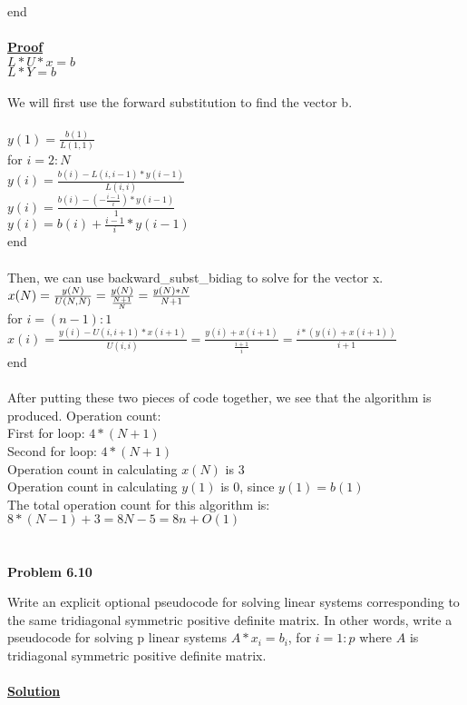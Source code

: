 \documentclass{article}
\begin{document}
			\indent \hspace{5 cm} end \\\\
\underline{\textbf {Proof}} \\
	\indent \(L*U*x=b\)\\
	\indent \(L*Y=b\)\\\\
We will first use the forward substitution to find the vector b. \\\\
\(y(1) = \frac{b(1)}{L(1,1)}\)\\
for \(i=2:N\)\\
	\indent \(y(i) = \frac{b(i)-L(i,i-1)*y(i-1)}{L(i,i)}\)\\
	\indent \(y(i) = \frac{b(i)-(-\frac{i-1}{i})*y(i-1)}{1}\)\\
	\indent \(y(i) = b(i)+\frac{i-1}{i}*y(i-1)\)\\
end\\\\
Then, we can use backward\_subst\_bidiag to solve for the vector x.\\
\indent \(x(N) = \frac{y(N)}{U(N,N)} = \frac{y(N)}{\frac{N+1}{N}}= \frac{y(N)*N}{N+1}\\\)\\
for \(i =(n-1):1\)\\
\indent \(x(i)=\frac{y(i) - U(i,i+1)*x(i+1)}{U(i,i)} = \frac{y(i) + x(i+1)}{\frac{i+1}{i}} = \frac{i*(y(i) + x(i+1))}{i+1}   \)\\
end\\\\
After putting these two pieces of code together, we see that the algorithm is produced.
Operation count:\\
	\indent First for loop: \(4*(N+1)\)\\
	\indent Second for loop: \(4*(N+1)\)\\
	\indent Operation count in calculating \(x(N)\) is 3\\
	\indent Operation count in calculating \(y(1)\) is 0, since \(y(1)=b(1)\)\\ 
The total operation count for this algorithm is: \(8*(N-1) + 3 = 8N - 5 = 8n+O(1)\)

\newpage{}
\section{}
\textbf {Problem 6.10} \\

\par Write an explicit optional pseudocode for solving linear systems corresponding to the same tridiagonal symmetric positive definite matrix. In other words, write a pseudocode for solving p linear systems \(A*x_i = b_i\), for \(i=1:p\) where \(A\) is tridiagonal symmetric positive definite matrix.\\\\
\underline{\textbf {Solution}} \\
\end{document}
